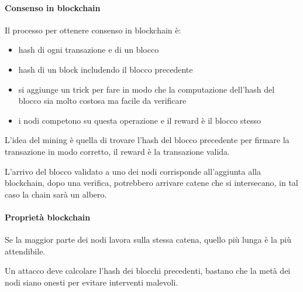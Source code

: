\paragraph{Consenso in blockchain}
Il processo per ottenere consenso in blockchain è:
\begin{itemize}
    \item hash di ogni transazione e di un blocco
    \item hash di un block includendo il blocco precedente
    \item si aggiunge un trick per fare in modo che la computazione 
    dell'hash del blocco sia molto costosa ma facile da verificare
    \item i nodi competono su questa operazione e il reward è 
    il blocco stesso 
\end{itemize} 
L'idea del mining è quella di trovare l'hash del blocco precedente 
per firmare la transazione in modo corretto, il reward è la transazione valida.

L'arrivo del blocco validato a uno dei nodi corrisponde all'aggiunta 
alla blockchain, dopo una verifica, potrebbero arrivare catene che si intersecano, 
in tal caso la chain sarà un albero.

\paragraph{Proprietà blockchain}
Se la maggior parte dei nodi lavora sulla stessa catena, quello più lunga è la più
attendibile. 

Un attacco deve calcolare l'hash dei blocchi precedenti, bastano che la metà
dei nodi siano onesti per evitare interventi malevoli.

